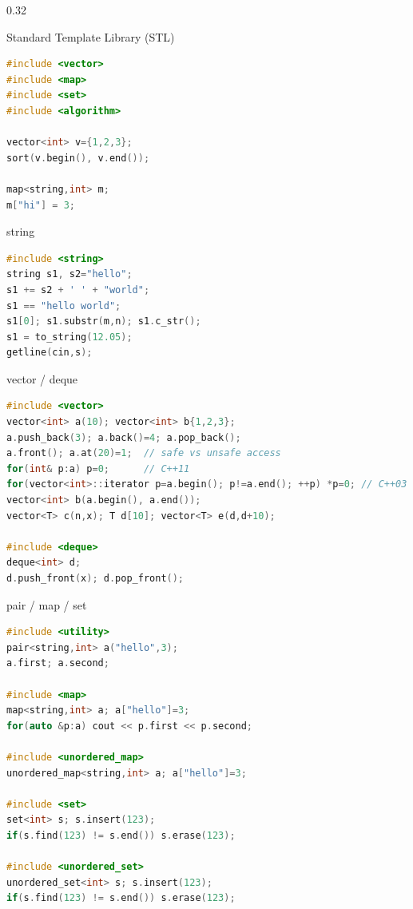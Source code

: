 \documentclass[final]{beamer}
\begin{document}
\begin{frame}[t,fragile]

\begin{columns}[t,totalwidth=\paperwidth, colsep=0.015\paperwidth]

\begin{column}{0.32\paperwidth}
\
\begin{block}{Standard Template Library (STL)}
\begin{lstlisting}[language=C++]
#include <vector>
#include <map>
#include <set>
#include <algorithm>

vector<int> v={1,2,3};
sort(v.begin(), v.end());

map<string,int> m;
m["hi"] = 3;
\end{lstlisting}
\end{block}



\begin{block}{string}
\begin{lstlisting}[language=C++]
#include <string>
string s1, s2="hello";
s1 += s2 + ' ' + "world";
s1 == "hello world";
s1[0]; s1.substr(m,n); s1.c_str();
s1 = to_string(12.05);
getline(cin,s);
\end{lstlisting}
\end{block}

\begin{block}{vector / deque}
\begin{lstlisting}[language=C++]
#include <vector>
vector<int> a(10); vector<int> b{1,2,3};
a.push_back(3); a.back()=4; a.pop_back();
a.front(); a.at(20)=1;  // safe vs unsafe access
for(int& p:a) p=0;      // C++11
for(vector<int>::iterator p=a.begin(); p!=a.end(); ++p) *p=0; // C++03
vector<int> b(a.begin(), a.end());
vector<T> c(n,x); T d[10]; vector<T> e(d,d+10);

#include <deque>
deque<int> d;
d.push_front(x); d.pop_front();
\end{lstlisting}
\end{block}

\begin{block}{pair / map / set}
\begin{lstlisting}[language=C++]
#include <utility>
pair<string,int> a("hello",3);
a.first; a.second;

#include <map>
map<string,int> a; a["hello"]=3;
for(auto &p:a) cout << p.first << p.second;

#include <unordered_map>
unordered_map<string,int> a; a["hello"]=3;

#include <set>
set<int> s; s.insert(123);
if(s.find(123) != s.end()) s.erase(123);

#include <unordered_set>
unordered_set<int> s; s.insert(123);
if(s.find(123) != s.end()) s.erase(123);
\end{lstlisting}
\end{block}



\end{column}

\end{columns}
\end{frame}
\end{document}
